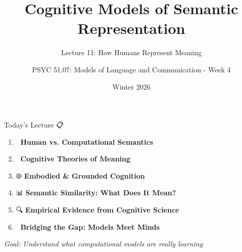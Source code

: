 \documentclass[aspectratio=169]{beamer}
\title{Cognitive Models of Semantic Representation}
\subtitle{Lecture 11: How Humans Represent Meaning}
\author{PSYC 51.07: Models of Language and Communication - Week 4}
\date{Winter 2026}
\begin{document}
\begin{frame}[shrink=10]
\titlepage
\end{frame}

\begin{frame}[shrink=10]{Today's Lecture 📋}
\large
\begin{enumerate}\setlength{\itemsep}{0pt}
    \item 🧠 \textbf{Human vs. Computational Semantics}
    \item 🔬 \textbf{Cognitive Theories of Meaning}
    \item 🌐 \textbf{Embodied \& Grounded Cognition}
    \item 📊 \textbf{Semantic Similarity: What Does It Mean?}
    \item 🔍 \textbf{Empirical Evidence from Cognitive Science}
    \item 🤖 \textbf{Bridging the Gap: Models Meet Minds}
\end{enumerate}

\vspace{1em}
\textit{Goal: Understand what computational models are really learning}
\end{frame}
\end{document}
